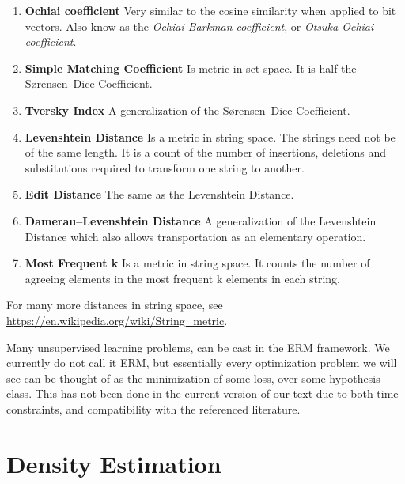 \begin{enumerate}
\item \textbf{Ochiai coefficient} Very similar to the cosine similarity when applied to bit vectors.
Also know as the \emph{Ochiai-Barkman coefficient}, or \emph{Otsuka-Ochiai coefficient}.

\item \textbf{Simple Matching Coefficient} Is metric in set space. It is half the  Sørensen–Dice Coefficient.

\item \textbf{Tversky Index} A generalization of the Sørensen–Dice Coefficient.

\item \textbf{Levenshtein Distance} Is a metric in string space. The strings need not be of the same length. It is a count of the number of insertions, deletions and substitutions required to transform one string to another. 

\item \textbf{Edit Distance} The same as the Levenshtein Distance.

\item \textbf{Damerau–Levenshtein Distance} A generalization of the Levenshtein Distance which also allows transportation as an elementary operation. 

\item \textbf{Most Frequent k} Is a metric in string space. It counts the number of agreeing elements in the most frequent k elements in each string.


\end{enumerate}

For many more distances in string space, see \url{https://en.wikipedia.org/wiki/String_metric}.




\begin{remark}
Many unsupervised learning problems, can be cast in the ERM framework.
We currently do not call it ERM, but essentially every optimization problem we will see can be thought of as the minimization of some loss, over some hypothesis class.
This has not been done in the current version of our text due to both time constraints, and compatibility with the referenced literature.
\end{remark}




\section{Density Estimation}
\label{sec:density_estimation}

